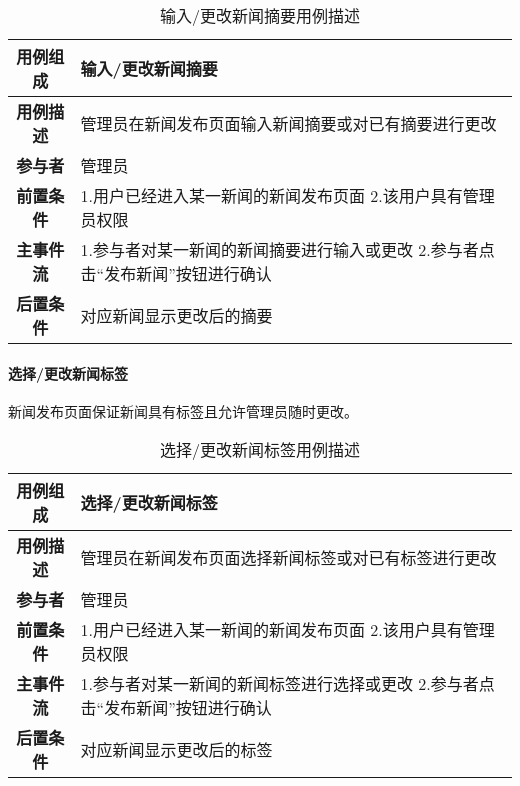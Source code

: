\begin{table}[H]
	\centering
	\caption{输入/更改新闻摘要用例描述}
	\renewcommand\arraystretch{1.5}
	\begin{tabular}{|c|>{\raggedright\arraybackslash}p{10cm}|}
		\hline
		\textbf{用例组成} & \textbf{输入/更改新闻摘要}\\
		\hline
		\textbf{用例描述} & 管理员在新闻发布页面输入新闻摘要或对已有摘要进行更改\\ 
		\hline
		\textbf{参与者} & 管理员\\
		\hline
		\textbf{前置条件} & 
		1.用户已经进入某一新闻的新闻发布页面\newline
		2.该用户具有管理员权限\\
		\hline
		\textbf{主事件流} & 
		1.参与者对某一新闻的新闻摘要进行输入或更改\newline
		2.参与者点击“发布新闻”按钮进行确认\\
		\hline
		\textbf{后置条件} & 对应新闻显示更改后的摘要\\
		\hline
	\end{tabular}
\end{table}

\paragraph{选择/更改新闻标签}

新闻发布页面保证新闻具有标签且允许管理员随时更改。\\

\begin{table}[H]
	\centering
	\caption{选择/更改新闻标签用例描述}
	\renewcommand\arraystretch{1.5}
	\begin{tabular}{|c|>{\raggedright\arraybackslash}p{10cm}|}
		\hline
		\textbf{用例组成} & \textbf{选择/更改新闻标签}\\
		\hline
		\textbf{用例描述} & 管理员在新闻发布页面选择新闻标签或对已有标签进行更改\\ 
		\hline
		\textbf{参与者} & 管理员\\
		\hline
		\textbf{前置条件} & 
		1.用户已经进入某一新闻的新闻发布页面\newline
		2.该用户具有管理员权限\\
		\hline
		\textbf{主事件流} & 
		1.参与者对某一新闻的新闻标签进行选择或更改\newline
		2.参与者点击“发布新闻”按钮进行确认\\
		\hline
		\textbf{后置条件} & 对应新闻显示更改后的标签\\
		\hline
	\end{tabular}
\end{table}

